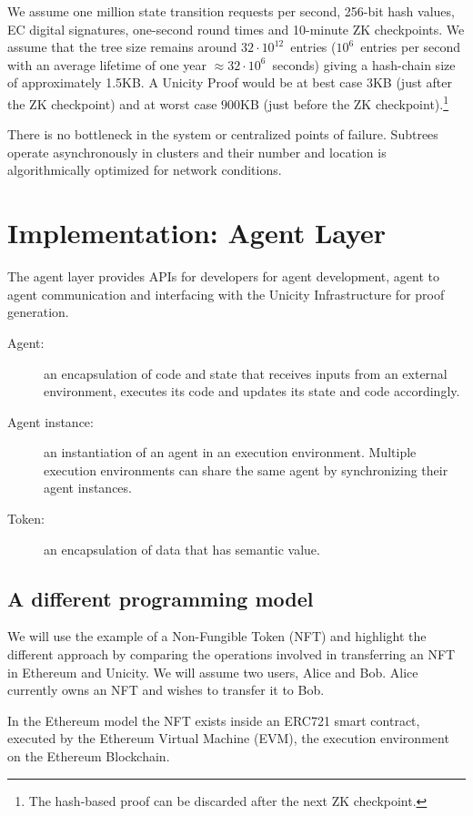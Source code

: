 \documentclass{article}
\begin{document}
We assume one million state transition requests per second, 256-bit hash values, EC digital signatures, one-second round times and 10-minute ZK checkpoints. We assume that the tree size remains around $32 \cdot 10^{12}$~entries ($10^6$~entries per second with an average lifetime of one year $\approx 32 \cdot 10^6$~seconds) giving a hash-chain size of approximately 1.5\;KB.
A Unicity Proof would be at best case $3$\;KB (just after the ZK checkpoint) and at worst case $900$\;KB (just before the ZK checkpoint).\footnote{The hash-based proof can be discarded after the next ZK checkpoint.}

There is no bottleneck in the system or centralized points of failure. Subtrees operate asynchronously in clusters and their number and location is algorithmically optimized for network conditions.

\section{Implementation: Agent Layer}

The agent layer provides APIs for developers for agent development, agent to agent communication and interfacing with the Unicity Infrastructure for proof generation.

\begin{description}
    \item[Agent:] an encapsulation of code and state that receives inputs from an external environment, executes its code and updates its state and code accordingly.
    \item[Agent instance:] an instantiation of an agent in an execution environment. Multiple execution environments can share the same agent by synchronizing their agent instances.
    \item[Token:] an encapsulation of data that has semantic value.
\end{description}


\subsection{A different programming model}

We will use the example of a Non-Fungible Token (NFT) and highlight the different approach by comparing the operations involved in transferring an NFT in Ethereum and Unicity.  We will assume two users, Alice and Bob. Alice currently owns an NFT and wishes to transfer it to Bob.

In the Ethereum model the NFT exists inside an ERC721 smart contract, executed by the Ethereum Virtual Machine (EVM), the execution environment on the Ethereum Blockchain.
\end{document}
